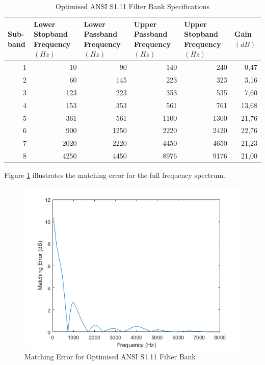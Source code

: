 \documentclass[11pt,onecolumn]{witseiepaper}
\begin{document}
\begin{appendices}
\begin{table}[htbp]
  \centering
  \caption{Optimised ANSI S1.11 Filter Bank Specifications}
  \begin{adjustbox}{width=0.9\linewidth}
    \begin{tabular}{|r|r|r|r|r|r|}
    \hline
    \multicolumn{1}{|l|}{\textbf{Sub-band}} & \multicolumn{1}{l|}{\textbf{Lower Stopband Frequency $(Hz)$}} & \multicolumn{1}{l|}{\textbf{Lower Passband Frequency $(Hz)$}} & \multicolumn{1}{l|}{\textbf{Upper Passband Frequency $(Hz)$}} & \multicolumn{1}{l|}{\textbf{Upper Stopband Frequency $(Hz)$}} & \multicolumn{1}{l|}{\textbf{Gain $(dB)$}} \\
    \hline
    1     & 10    & 90    & 140   & 240   & 0,47 \\
    \hline
    2     & 60    & 145   & 223   & 323   & 3,16 \\
    \hline
    3     & 123   & 223   & 353   & 535   & 7,60 \\
    \hline
    4     & 153   & 353   & 561   & 761   & 13,68 \\
    \hline
    5     & 361   & 561   & 1100  & 1300  & 21,76 \\
    \hline
    6     & 900   & 1250  & 2220  & 2420  & 22,76 \\
    \hline
    7     & 2020  & 2220  & 4450  & 4650  & 21,23 \\
    \hline
    8     & 4250  & 4450  & 8976  & 9176  & 21,00 \\
    \hline
    \end{tabular}%
    \end{adjustbox}
  \label{tab:ansiOptSpec}%
\end{table}%

\noindent Figure \ref{fig:ansiOptMatErr} illustrates the matching error for the full frequency spectrum.

\begin{figure}[h]
\centering
\includegraphics[width=0.6\linewidth]{ansiOptMatErr.PNG}
\caption{Matching Error for Optimised ANSI S1.11 Filter Bank}
\label{fig:ansiOptMatErr}
\end{figure} 


\end{appendices}
\end{document}
